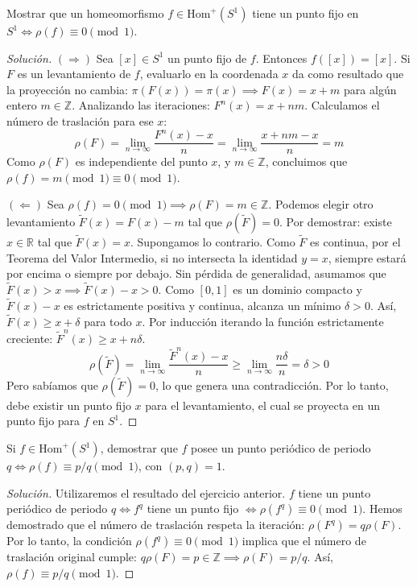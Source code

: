 \begin{ejercicio}
	Mostrar que un homeomorfismo $f \in \text{Hom}^+(S^1)$ tiene un punto fijo en $S^1 \iff \rho(f) \equiv 0 \pmod 1$.
\end{ejercicio}
\begin{proof}[Solución]
	$(\Rightarrow)$ Sea $[x] \in S^1$ un punto fijo de $f$. Entonces $f([x]) = [x]$. 
	Si $F$ es un levantamiento de $f$, evaluarlo en la coordenada $x$ da como resultado que la proyección no cambia: $\pi(F(x)) = \pi(x) \implies F(x) = x + m$ para algún entero $m \in \mathbb{Z}$.
	Analizando las iteraciones: $F^n(x) = x + nm$.
	Calculamos el número de traslación para ese $x$:
	$$ \rho(F) = \lim_{n \to \infty} \frac{F^n(x) - x}{n} = \lim_{n \to \infty} \frac{x + nm - x}{n} = m $$
	Como $\rho(F)$ es independiente del punto $x$, y $m \in \mathbb{Z}$, concluimos que $\rho(f) = m \pmod 1 \equiv 0 \pmod 1$.
	
	$(\Leftarrow)$ Sea $\rho(f) = 0 \pmod 1 \implies \rho(F) = m \in \mathbb{Z}$. Podemos elegir otro levantamiento $\tilde{F}(x) = F(x) - m$ tal que $\rho(\tilde{F}) = 0$.
	Por demostrar: existe $x \in \mathbb{R}$ tal que $\tilde{F}(x) = x$.
	Supongamos lo contrario. Como $\tilde{F}$ es continua, por el Teorema del Valor Intermedio, si no intersecta la identidad $y=x$, siempre estará por encima o siempre por debajo. Sin pérdida de generalidad, asumamos que $\tilde{F}(x) > x \implies \tilde{F}(x) - x > 0$.
	Como $[0,1]$ es un dominio compacto y $\tilde{F}(x)-x$ es estrictamente positiva y continua, alcanza un mínimo $\delta > 0$.
	Así, $\tilde{F}(x) \ge x + \delta$ para todo $x$. 
	Por inducción iterando la función estrictamente creciente: $\tilde{F}^n(x) \ge x + n\delta$.
	$$ \rho(\tilde{F}) = \lim_{n \to \infty} \frac{\tilde{F}^n(x) - x}{n} \ge \lim_{n \to \infty} \frac{n\delta}{n} = \delta > 0 $$
	Pero sabíamos que $\rho(\tilde{F}) = 0$, lo que genera una contradicción. Por lo tanto, debe existir un punto fijo $x$ para el levantamiento, el cual se proyecta en un punto fijo para $f$ en $S^1$.
\end{proof}

\begin{ejercicio}
	Si $f \in \text{Hom}^+(S^1)$, demostrar que $f$ posee un punto periódico de periodo $q \iff \rho(f) \equiv p/q \pmod 1$, con $(p,q)=1$.
\end{ejercicio}
\begin{proof}[Solución]
	Utilizaremos el resultado del ejercicio anterior.
	$f$ tiene un punto periódico de periodo $q \iff f^q$ tiene un punto fijo $\iff \rho(f^q) \equiv 0 \pmod 1$.
	Hemos demostrado que el número de traslación respeta la iteración: $\rho(F^q) = q \rho(F)$.
	Por lo tanto, la condición $\rho(f^q) \equiv 0 \pmod 1$ implica que el número de traslación original cumple: $q \rho(F) = p \in \mathbb{Z} \implies \rho(F) = p/q$.
	Así, $\rho(f) \equiv p/q \pmod 1$.
\end{proof}

